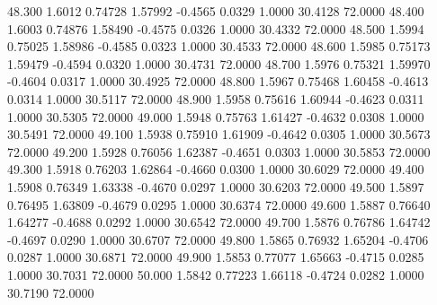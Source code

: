   48.300   1.6012   0.74728   1.57992  -0.4565   0.0329   1.0000  30.4128  72.0000
  48.400   1.6003   0.74876   1.58490  -0.4575   0.0326   1.0000  30.4332  72.0000
  48.500   1.5994   0.75025   1.58986  -0.4585   0.0323   1.0000  30.4533  72.0000
  48.600   1.5985   0.75173   1.59479  -0.4594   0.0320   1.0000  30.4731  72.0000
  48.700   1.5976   0.75321   1.59970  -0.4604   0.0317   1.0000  30.4925  72.0000
  48.800   1.5967   0.75468   1.60458  -0.4613   0.0314   1.0000  30.5117  72.0000
  48.900   1.5958   0.75616   1.60944  -0.4623   0.0311   1.0000  30.5305  72.0000
  49.000   1.5948   0.75763   1.61427  -0.4632   0.0308   1.0000  30.5491  72.0000
  49.100   1.5938   0.75910   1.61909  -0.4642   0.0305   1.0000  30.5673  72.0000
  49.200   1.5928   0.76056   1.62387  -0.4651   0.0303   1.0000  30.5853  72.0000
  49.300   1.5918   0.76203   1.62864  -0.4660   0.0300   1.0000  30.6029  72.0000
  49.400   1.5908   0.76349   1.63338  -0.4670   0.0297   1.0000  30.6203  72.0000
  49.500   1.5897   0.76495   1.63809  -0.4679   0.0295   1.0000  30.6374  72.0000
  49.600   1.5887   0.76640   1.64277  -0.4688   0.0292   1.0000  30.6542  72.0000
  49.700   1.5876   0.76786   1.64742  -0.4697   0.0290   1.0000  30.6707  72.0000
  49.800   1.5865   0.76932   1.65204  -0.4706   0.0287   1.0000  30.6871  72.0000
  49.900   1.5853   0.77077   1.65663  -0.4715   0.0285   1.0000  30.7031  72.0000
  50.000   1.5842   0.77223   1.66118  -0.4724   0.0282   1.0000  30.7190  72.0000
